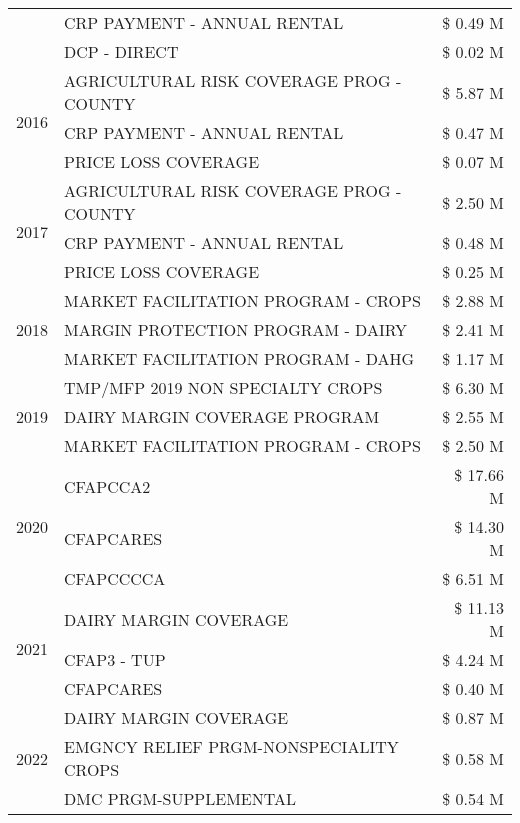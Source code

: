 \begin{tabular}{llr}
 & CRP PAYMENT - ANNUAL RENTAL & \$ 0.49 M \\
 & DCP - DIRECT & \$ 0.02 M \\
\cline{1-3}
\multirow[t]{3}{*}{2016} & AGRICULTURAL RISK COVERAGE PROG - COUNTY & \$ 5.87 M \\
 & CRP PAYMENT - ANNUAL RENTAL & \$ 0.47 M \\
 & PRICE LOSS COVERAGE & \$ 0.07 M \\
\cline{1-3}
\multirow[t]{3}{*}{2017} & AGRICULTURAL RISK COVERAGE PROG - COUNTY & \$ 2.50 M \\
 & CRP PAYMENT - ANNUAL RENTAL & \$ 0.48 M \\
 & PRICE LOSS COVERAGE & \$ 0.25 M \\
\cline{1-3}
\multirow[t]{3}{*}{2018} & MARKET FACILITATION PROGRAM - CROPS & \$ 2.88 M \\
 & MARGIN PROTECTION PROGRAM - DAIRY & \$ 2.41 M \\
 & MARKET FACILITATION PROGRAM - DAHG & \$ 1.17 M \\
\cline{1-3}
\multirow[t]{3}{*}{2019} & TMP/MFP 2019 NON SPECIALTY CROPS & \$ 6.30 M \\
 & DAIRY MARGIN COVERAGE PROGRAM & \$ 2.55 M \\
 & MARKET FACILITATION PROGRAM - CROPS & \$ 2.50 M \\
\cline{1-3}
\multirow[t]{3}{*}{2020} & CFAPCCA2 & \$ 17.66 M \\
 & CFAPCARES & \$ 14.30 M \\
 & CFAPCCCCA & \$ 6.51 M \\
\cline{1-3}
\multirow[t]{3}{*}{2021} & DAIRY MARGIN COVERAGE & \$ 11.13 M \\
 & CFAP3 - TUP & \$ 4.24 M \\
 & CFAPCARES & \$ 0.40 M \\
\cline{1-3}
\multirow[t]{3}{*}{2022} & DAIRY MARGIN COVERAGE & \$ 0.87 M \\
 & EMGNCY RELIEF PRGM-NONSPECIALITY CROPS & \$ 0.58 M \\
 & DMC PRGM-SUPPLEMENTAL & \$ 0.54 M \\
\cline{1-3}
\bottomrule
\end{tabular}
